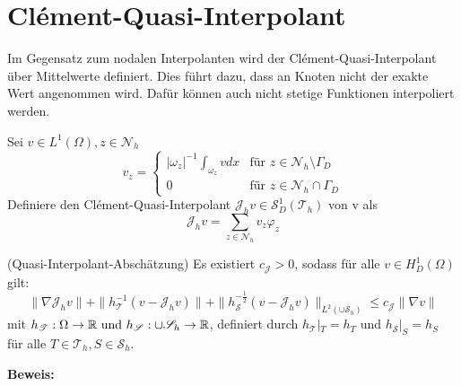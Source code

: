 \section{Clément-Quasi-Interpolant}
Im Gegensatz zum nodalen Interpolanten wird der Clément-Quasi-Interpolant über Mittelwerte definiert. Dies führt dazu, dass an Knoten nicht der exakte Wert angenommen wird. Dafür können auch nicht stetige Funktionen interpoliert werden.
\begin{definition}
    Sei $v \in L^1(\Omega) , z \in \mathscr{N}_h$
	\[
	v_z =  \left\{
	\begin{array}{ll}
		|\omega_z|^{-1} \int_{\omega_z} v dx& \text{f\"ur } z \in \mathscr{N}_h \setminus \Gamma_D\\
		0 &  \text{f\"ur } z \in \mathscr{N}_h \cap \Gamma_D
	\end{array}\right.
	\]
	Definiere den Clément-Quasi-Interpolant $\mathscr{J}_hv \in \mathscr{S}_D^1(\mathscr{T}_h)$ von v als
	\begin{displaymath}
		\mathscr{J}_hv = \sum_{z\in \mathscr{N}_h} v_z \varphi_z
	\end{displaymath}
\end{definition}
\begin{theorem}(Quasi-Interpolant-Abschätzung)
	Es existiert $c_\mathscr{J} > 0$, sodass f\"ur alle $v\in H^1_D(\Omega)$ gilt:
	\[
	\|\nabla\mathscr{J}_hv\| +\|h^{-1}_\mathscr{T}(v-\mathscr{J}_hv)\| +\|h^{-\frac{1}{2}}_\mathscr{S}(v-\mathscr{J}_hv)\|_{L^2(\cup\mathscr{S}_h)} \leq c_\mathscr{J}\|\nabla v\|
	\]
	mit $h_\mathscr{T}: \Omega \rightarrow  \mathbb{R} \text{ und } h_\mathscr{S}: \cup \mathscr{S}_h \rightarrow  \mathbb{R}$, definiert durch $h_\mathscr{T}|_T = h_T \text{ und }  h_\mathscr{S}|_S = h_S$ \\ f\"ur alle $T\in\mathscr{T}_h, S\in\mathscr{S}_h$.
\end{theorem}
\textbf{Beweis:}
